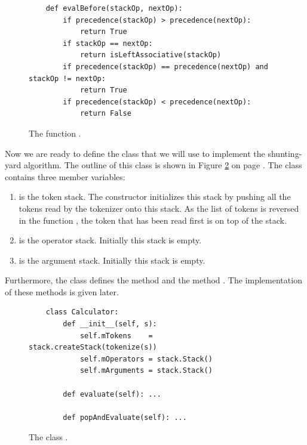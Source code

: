 \begin{figure}[!ht]
\centering
\begin{verbatim}
    def evalBefore(stackOp, nextOp):
        if precedence(stackOp) > precedence(nextOp):
            return True
        if stackOp == nextOp:
            return isLeftAssociative(stackOp)
        if precedence(stackOp) == precedence(nextOp) and stackOp != nextOp:
            return True
        if precedence(stackOp) < precedence(nextOp):
            return False
\end{verbatim}
\vspace*{-0.3cm}
\caption{The function .}
\label{fig:evalBefore}
\end{figure}

Now we are ready to define the class  that we will use to implement the shunting-yard
algorithm.  The outline of this class is shown in Figure \ref{fig:Calculator.ipynb} on page
\pageref{fig:Calculator.ipynb}.  The class contains three member variables:
\begin{enumerate}
\item {} is the token stack.  The constructor initializes this stack by pushing all the tokens
      read by the tokenizer onto this stack.  As the list of tokens is reversed in the function
      , the token that has been read first is on top of the stack.
\item {} is the operator stack.  Initially this stack is empty.
\item {} is the argument stack.  Initially this stack is empty.
\end{enumerate}
Furthermore, the class defines the method  and the method .
The implementation of these methods is given later.

\begin{figure}[!ht]
  \centering
\begin{verbatim}
    class Calculator:
        def __init__(self, s):
            self.mTokens    = stack.createStack(tokenize(s))
            self.mOperators = stack.Stack()
            self.mArguments = stack.Stack()
  
        def evaluate(self): ...

        def popAndEvaluate(self): ...
\end{verbatim}
\vspace*{-0.3cm}
  \caption{The class .}
  \label{fig:Calculator.ipynb}
\end{figure} 


